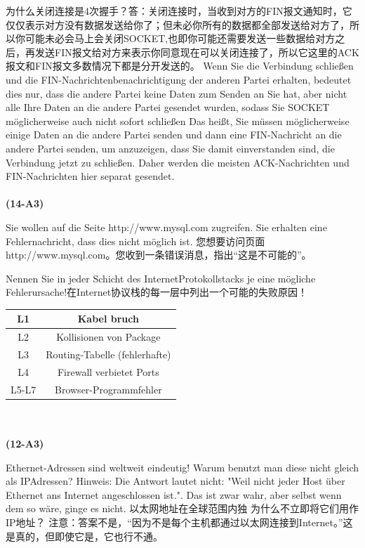 \documentclass[fleqn]{article}
\begin{document}
为什么关闭连接是4次握手？答：关闭连接时，当收到对方的FIN报文通知时，它仅仅表示对方没有数据发送给你了；但未必你所有的数据都全部发送给对方了，所以你可能未必会马上会关闭SOCKET,也即你可能还需要发送一些数据给对方之后，再发送FIN报文给对方来表示你同意现在可以关闭连接了，所以它这里的ACK报文和FIN报文多数情况下都是分开发送的。
Wenn Sie die Verbindung schließen und die FIN-Nachrichtenbenachrichtigung der anderen Partei erhalten, bedeutet dies nur, dass die andere Partei keine Daten zum Senden an Sie hat, aber nicht alle Ihre Daten an die andere Partei gesendet wurden, sodass Sie SOCKET möglicherweise auch nicht sofort schließen Das heißt, Sie müssen möglicherweise einige Daten an die andere Partei senden und dann eine FIN-Nachricht an die andere Partei senden, um anzuzeigen, dass Sie damit einverstanden sind, die Verbindung jetzt zu schließen. Daher werden die meisten ACK-Nachrichten und FIN-Nachrichten hier separat gesendet.
\\
\\
\noindent\textbf{(14-A3)}

Sie wollen auf die Seite http://www.mysql.com zugreifen. Sie erhalten eine Fehlernachricht, dass dies nicht möglich ist.
您想要访问页面http://www.mysql.com。您收到一条错误消息，指出“这是不可能的”。

Nennen Sie in jeder Schicht des Internet­Protokollstacks je eine mögliche Fehlerursache!在Internet协议栈的每一层中列出一个可能的失败原因！

\begin{tabular}{c|c}
    \hline
    L1&Kabel bruch\\
    \hline
    L2&Kollisionen von Package\\
    \hline
    L3&Routing-Tabelle (fehlerhafte)\\
    \hline
    L4&Firewall verbietet Ports\\
    \hline
    L5-L7&Browser-Programmfehler\\
    \hline
\end{tabular}
\\
\\
\noindent\textbf{(12-A3)} 

Ethernet-Adressen sind weltweit eindeutig! Warum benutzt man diese nicht gleich als IPAdressen?
Hinweis: Die Antwort lautet nicht: "Weil nicht jeder Host über Ethernet ans Internet angeschlossen ist.". Das ist zwar wahr, aber selbst wenn dem so wäre, ginge es nicht.
以太网地址在全球范围内独 为什么不立即将它们用作IP地址？
注意：答案不是，“因为不是每个主机都通过以太网连接到Internet。”这是真的，但即使它是，它也行不通。
\end{document}
